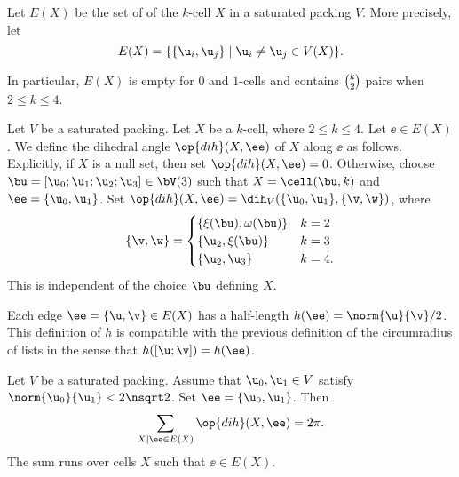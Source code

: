 \begin{definition}[edge]
  Let $E(X)$ be the set of  of the $k$-cell
  $X$ in a saturated packing $V$.  More precisely, let
\[ E(X)=\{\{ \u_i, \u_j\}\mid \u_i\ne \u_j\in
V( X)\}.\] 
\end{definition}
%
%

In particular, $E(X)$ is empty for $0$ and $1$-cells and contains
$\tbinom{k}{2}$ pairs when $2\le k\le 4$.

\begin{definition}[$\op{dih}$] \label{def:dihX}
Let $V$ be a saturated packing.  Let $X$ be
  a $k$-cell, where $2\le k\le 4$.  Let $\ee\in E(X)$.  We define the
  dihedral angle $\op{dih}(X,\ee)$ of $X$ along $\ee$ as follows.
  Explicitly, if $X$ is a null set, then set
  $\op{dih}(X,\ee)=0$. Otherwise, choose $\bu=[\u_0;\u_1;\u_2;\u_3]\in
  \bV(3)$ such that $X=\cell(\bu,k)$ and $\ee=\{\u_0,\u_1\}$.  Set
  $\op{dih}(X,\ee)=\dih_V(\{\u_0,\u_1\},\{\v,\w\})$, where
\[
\{\v,\w\} = 
\begin{cases}
  \{\xi(\bu),\omega(\bu) \} &  k=2\\
  \{\u_2,\xi(\bu)\} & k=3\\
  \{\u_2,\u_3\} &k=4.
\end{cases}
\]
This is independent of the choice $\bu$ defining $X$.
%
%
%
\end{definition}

Each
edge $\ee=\{ \u, \v\}\in E(X)$ has a half-length
$h(\ee) = \norm{ \u}{ \v}/2$.
This definition of $h$ is compatible with the previous definition of the circumradius
of lists in the sense that
$h([\u;\v]) = h(\ee)$.

\begin{lemma}
  Let $V$ be a saturated packing.  Assume that $\u_0,\u_1\in V$
  satisfy $\norm{\u_0}{\u_1}<2\nsqrt2$.  Set $\ee=\{\u_0,\u_1\}$.  Then
\[
\sum_{X\mid \ee\in E(X) } \op{dih}(X,\ee) = 2\pi.
\]
The sum runs over cells $X$ such that $\ee\in E(X)$.
\end{lemma}

